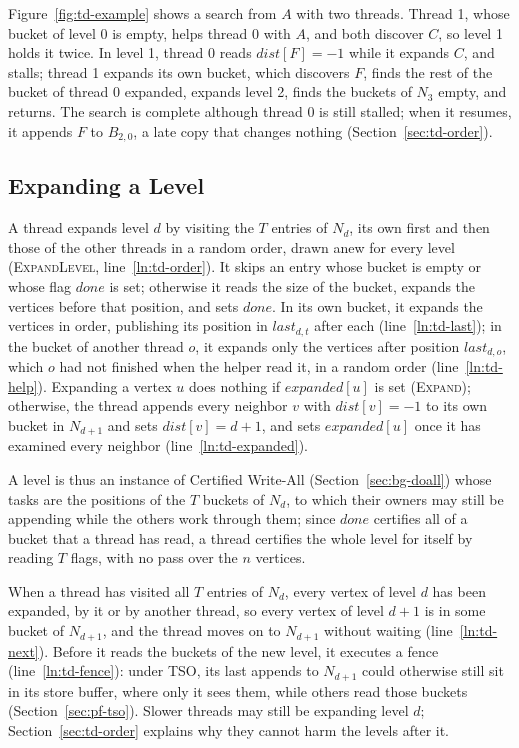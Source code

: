 Figure~\ref{fig:td-example} shows a search from $A$ with two threads. Thread 1, whose bucket of level 0 is empty, helps thread 0 with $A$, and both discover $C$, so level 1 holds it twice. In level 1, thread 0 reads $\mathit{dist}[F] = -1$ while it expands $C$, and stalls; thread 1 expands its own bucket, which discovers $F$, finds the rest of the bucket of thread 0 expanded, expands level 2, finds the buckets of $N_3$ empty, and returns. The search is complete although thread 0 is still stalled; when it resumes, it appends $F$ to $B_{2,0}$, a late copy that changes nothing (Section~\ref{sec:td-order}).

\subsection{Expanding a Level}
\label{sec:td-expand}

A thread expands level $d$ by visiting the $T$ entries of $N_d$, its own first and then those of the other threads in a random order, drawn anew for every level (\textsc{ExpandLevel}, line~\ref{ln:td-order}). It skips an entry whose bucket is empty or whose flag $\mathit{done}$ is set; otherwise it reads the size of the bucket, expands the vertices before that position, and sets $\mathit{done}$. In its own bucket, it expands the vertices in order, publishing its position in $\mathit{last}_{d,t}$ after each (line~\ref{ln:td-last}); in the bucket of another thread $o$, it expands only the vertices after position $\mathit{last}_{d,o}$, which $o$ had not finished when the helper read it, in a random order (line~\ref{ln:td-help}). Expanding a vertex $u$ does nothing if $\mathit{expanded}[u]$ is set (\textsc{Expand}); otherwise, the thread appends every neighbor $v$ with $\mathit{dist}[v] = -1$ to its own bucket in $N_{d+1}$ and sets $\mathit{dist}[v] = d+1$, and sets $\mathit{expanded}[u]$ once it has examined every neighbor (line~\ref{ln:td-expanded}).

A level is thus an instance of Certified Write-All (Section~\ref{sec:bg-doall}) whose tasks are the positions of the $T$ buckets of $N_d$, to which their owners may still be appending while the others work through them; since $\mathit{done}$ certifies all of a bucket that a thread has read, a thread certifies the whole level for itself by reading $T$ flags, with no pass over the $n$ vertices.

When a thread has visited all $T$ entries of $N_d$, every vertex of level $d$ has been expanded, by it or by another thread, so every vertex of level $d+1$ is in some bucket of $N_{d+1}$, and the thread moves on to $N_{d+1}$ without waiting (line~\ref{ln:td-next}). Before it reads the buckets of the new level, it executes a fence (line~\ref{ln:td-fence}): under TSO, its last appends to $N_{d+1}$ could otherwise still sit in its store buffer, where only it sees them, while others read those buckets (Section~\ref{sec:pf-tso}). Slower threads may still be expanding level $d$; Section~\ref{sec:td-order} explains why they cannot harm the levels after it.

